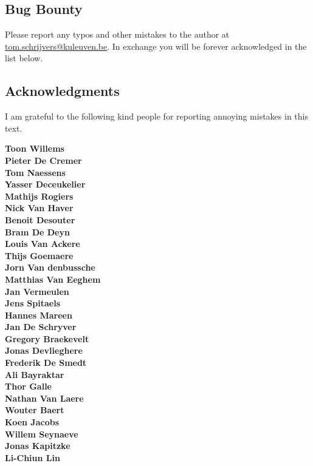 \subsection*{Bug Bounty}

Please report any typos and other mistakes to the author at \url{tom.schrijvers@kuleuven.be}.
In exchange you will be forever acknowledged in the list below.

\subsection*{Acknowledgments}

I am grateful to the following kind people
for reporting annoying mistakes in this text.

\noindent\begin{multicols}{3}
\noindent\textbf{Toon Willems}\\ 
\textbf{Pieter De Cremer}\\ 
\textbf{Tom Naessens}\\ 
\textbf{Yasser Deceukelier}\\
\textbf{Mathijs Rogiers}\\
\textbf{Nick Van Haver}\\
\textbf{Benoit Desouter}\\
\textbf{Bram De Deyn}\\
\textbf{Louis Van Ackere}\\
\textbf{Thijs Goemaere}\\
\textbf{Jorn Van denbussche}\\
\textbf{Matthias Van Eeghem}\\
\textbf{Jan Vermeulen}\\
\textbf{Jens Spitaels}\\
\textbf{Hannes Mareen}\\
\textbf{Jan De Schryver}\\
\textbf{Gregory Braekevelt}\\
\textbf{Jonas Devlieghere}\\
\textbf{Frederik De Smedt}\\
\textbf{Ali Bayraktar}\\
\textbf{Thor Galle}\\
\textbf{Nathan Van Laere}\\
\textbf{Wouter Baert}\\
\textbf{Koen Jacobs}\\
\textbf{Willem Seynaeve}\\
\textbf{Jonas Kapitzke}\\
\textbf{Li-Chiun Lin}\\

\end{multicols}
